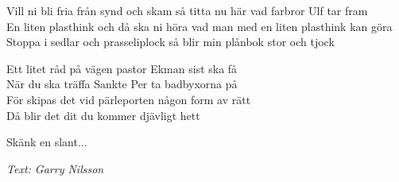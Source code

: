 \vspace{10pt}
Vill ni bli fria från synd och skam så titta nu här vad farbror Ulf tar fram\\
En liten plasthink och då ska ni höra vad man med en liten plasthink kan göra\\
Stoppa i sedlar och prasseliplock så blir min plånbok stor och tjock\par
\vspace{10pt}
Ett litet råd på vägen pastor Ekman sist ska få\\
När du ska träffa Sankte Per ta badbyxorna på\\
För skipas det vid pärleporten någon form av rätt\\
Då blir det dit du kommer djävligt hett\par
\vspace{10pt}
Skänk en slant...\par
\vspace{10pt}
{\footnotesize\textit{Text: Garry Nilsson}}
